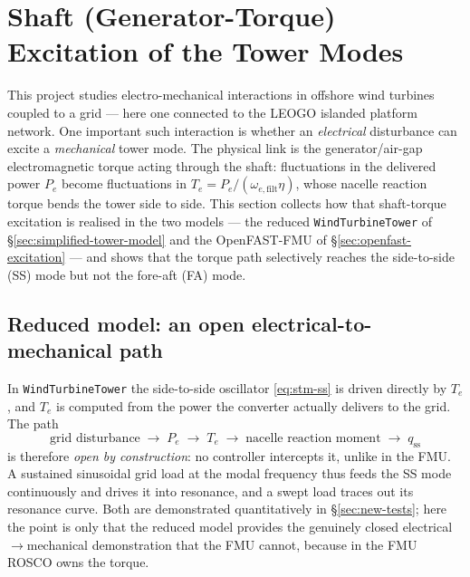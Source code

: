 
\section{Shaft (Generator-Torque) Excitation of the Tower Modes}
\label{sec:shaft-excitation}

This project studies electro-mechanical interactions in offshore wind turbines
coupled to a grid --- here one connected to the LEOGO islanded platform network.
One important such interaction is whether an \emph{electrical} disturbance can
excite a \emph{mechanical} tower mode. The physical link is the generator/air-gap
electromagnetic torque acting through the shaft: fluctuations in the delivered
power \(P_e\) become fluctuations in \(T_e = P_e/(\omega_{e,\mathrm{filt}}\eta)\),
whose nacelle reaction torque bends the tower side to side. This section collects
how that shaft-torque excitation is realised in the two models --- the reduced
\texttt{WindTurbineTower} of \S\ref{sec:simplified-tower-model} and the
OpenFAST-FMU of \S\ref{sec:openfast-excitation} --- and shows that the torque
path selectively reaches the side-to-side (SS) mode but not the fore-aft (FA)
mode.

\subsection{Reduced model: an open electrical-to-mechanical path}
\label{subsec:se-reduced}

In \texttt{WindTurbineTower} the side-to-side oscillator \eqref{eq:stm-ss} is
driven directly by \(T_e\), and \(T_e\) is computed from the power the converter
actually delivers to the grid. The path
\begin{equation}
  \text{grid disturbance}\;\longrightarrow\;P_e
  \;\longrightarrow\;T_e
  \;\longrightarrow\;\text{nacelle reaction moment}
  \;\longrightarrow\;q_{\mathrm{ss}}
  \label{eq:se-path}
\end{equation}
is therefore \emph{open by construction}: no controller intercepts it, unlike in
the FMU. A sustained sinusoidal grid load at the modal frequency thus feeds the
SS mode continuously and drives it into resonance, and a swept load traces out
its resonance curve. Both are demonstrated quantitatively in
\S\ref{sec:new-tests}; here the point is only that the reduced model provides the
genuinely closed electrical\(\to\)mechanical demonstration that the FMU cannot,
because in the FMU ROSCO owns the torque.

